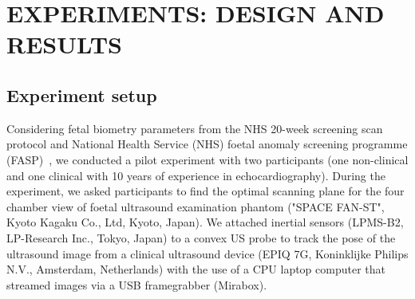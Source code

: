 \documentclass[a4paper, 10pt, conference]{ieeeconf}      %
\begin{document}

\section{EXPERIMENTS: DESIGN AND RESULTS}
\subsection{Experiment setup}
Considering fetal biometry parameters from the NHS 20-week screening scan protocol and National Health Service (NHS) foetal anomaly screening programme (FASP)~\cite{NHS_england2022},
we conducted a pilot experiment with two participants (one non-clinical and one clinical with 10 years of experience in echocardiography).
During the experiment, we asked participants to find the optimal scanning plane for the four chamber view of foetal ultrasound examination phantom ("SPACE FAN-ST", Kyoto Kagaku Co., Ltd, Kyoto, Japan).
We attached inertial sensors (LPMS-B2, LP-Research Inc., Tokyo, Japan) to a convex US probe to track the pose of the ultrasound image from a clinical ultrasound device (EPIQ 7G, Koninklijke Philips N.V., Amsterdam, Netherlands) with the use of a CPU laptop computer that streamed images via a USB framegrabber (Mirabox).
\end{document}
